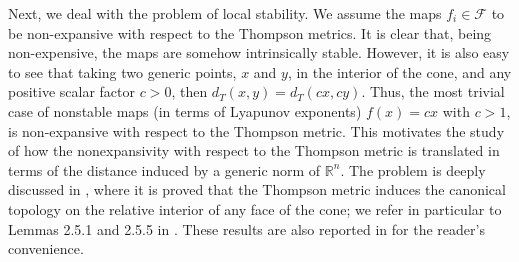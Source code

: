 \documentclass{article}
\newcommand{\R}{\mathbb{R}}
\newcommand{\family}{\mathcal{F}}
\newcommand{\distT}{d_T}
\begin{document}
Next, we deal with the problem of local stability. We assume the maps $f_i\in \family$ to be non-expansive with respect to the Thompson metrics. It is clear that, being non-expensive, the maps are somehow intrinsically stable. However, it is also easy to see that taking two generic points, $x$ and $y$, in the interior of the cone, and any positive scalar factor $c>0$, then $\distT(x,y)=\distT(cx,cy)$. Thus, the most trivial case of nonstable maps (in terms of Lyapunov exponents)  $f(x)=cx$ with $c>1$, is non-expansive with respect to the Thompson metric. This motivates the study of how the nonexpansivity with respect to the Thompson metric is translated in terms of the distance induced by a generic norm of $\R^n$. The problem is deeply discussed in \cite{lemmens2012nonlinear}, where it is proved that the Thompson metric induces the canonical topology on the relative interior of any face of the cone; we refer in particular to Lemmas 2.5.1 and 2.5.5 in \cite{lemmens2012nonlinear}. These results are also reported in  for the reader's convenience. 
%
\end{document}

